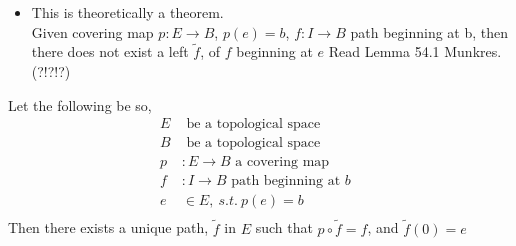     \begin{itemize}
        \item 
            This is theoretically a theorem.\\
            Given covering map $p:E\rightarrow B$, $p(e)=b$,
            $f:I \rightarrow B$ path beginning at b, then there does not exist a left $\tilde{f}$,
            of $f$ beginning at $e$ Read Lemma 54.1 Munkres. (?!?!?)
    \end{itemize}
    \begin{theorem}
        Let the following be so,
        \begin{align*}
            E& \text{ be a topological space}\\
            B& \text{ be a topological space}\\
            p&:E \rightarrow B \text{ a covering map}\\
            f&:I \rightarrow B \text{ path beginning at $b$ }\\
            e &\in E,\ s.t.\ p(e)=b\\
        \end{align*}
        Then there exists a unique path, $\tilde{f}$ in $E$ such that $p\circ \tilde{f}=f$, and
        $\tilde{f}(0)=e$
    \end{theorem}

